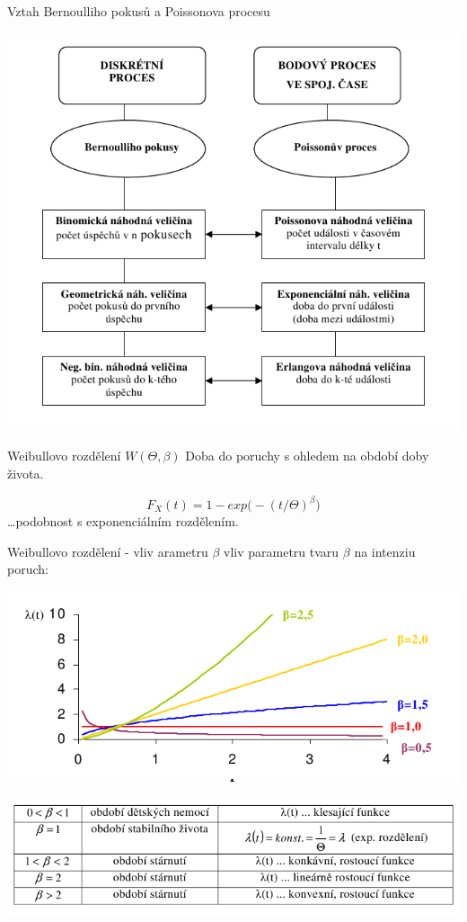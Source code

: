 \documentclass[smaller]{beamer}
\begin{document}
\begin{frame}{Vztah Bernoulliho pokusů a Poissonova procesu}
 \begin{center}
 \includegraphics[scale=0.5]{./bernoulli_poisson.png}
\end{center}
\end{frame}

\begin{frame}{Weibullovo rozdělení $W(\Theta, \beta)$}
Doba do poruchy s ohledem na období doby života.

\[
 F_X(t) = 1-exp\big( -(t/\Theta)^\beta \big )
\]
\dots podobnost s exponenciálním rozdělením.
\end{frame}

\begin{frame}{Weibullovo rozdělení - vliv arametru $\beta$}
vliv parametru tvaru $\beta$ na intenziu poruch:
 \begin{center}
 \includegraphics[scale=0.5]{./weibull_intenzita.png}
\end{center}
\begin{center}
 \includegraphics[scale=0.5]{./weibull_shape.png}
\end{center}
\end{frame}
\end{document}

